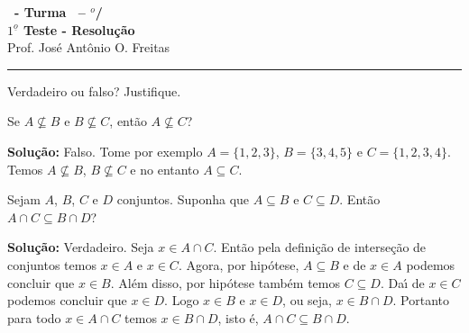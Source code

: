 \documentclass[12pt]{exam}
\begin{document}
\begin{center}
{\Large\bf \disciplina\ - Turma \turma\ -- \semestre$^{o}$/\ano} \\ \vspace{9pt} {\large\bf
$1^{\underline{o}}$ Teste - Resolu\c{c}\~ao}\\
\vspace{9pt} Prof. Jos{\'e} Ant{\^o}nio O. Freitas
\end{center}
\hrule

\vspace{.6cm}


\vspace{.6cm}

\questao Verdadeiro ou falso? Justifique.
\begin{center}
    Se $A \nsubseteq B$ e $B \nsubseteq C$, ent\~ao $A \nsubseteq C$?
\end{center}

\noindent\textbf{Solu\c{c}\~ao:} Falso. Tome por exemplo $A = \{1, 2, 3\}$, $B = \{3, 4, 5\}$ e $C = \{1, 2, 3, 4\}$. Temos $A \nsubseteq B$, $B \nsubseteq C$ e no entanto $A \subseteq C$.

\vspace{.5cm}

\questao Sejam $A$, $B$, $C$ e $D$ conjuntos. Suponha que $A \subseteq B$ e $C \subseteq D$. Ent\~ao $A \cap C \subseteq B \cap D$?

\noindent\textbf{Solu\c{c}\~ao:} Verdadeiro. Seja $x \in A \cap C$. Ent\~ao pela defini\c{c}\~ao de interse\c{c}\~ao de conjuntos temos $x \in A$ e $x \in C$. Agora, por hip\'otese, $A \subseteq B$ e de $x \in A$ podemos concluir que $x \in B$. Al\'em disso, por hip\'otese tamb\'em temos $C \subseteq D$. Da{\'\i} de $x \in C$ podemos concluir que $x \in D$. Logo $x \in B$ e $x \in D$, ou seja, $x \in B \cap D$. Portanto para todo $x \in A \cap C$ temos $x \in B \cap D$, isto \'e, $A \cap C \subseteq B \cap D$.
\end{document}
